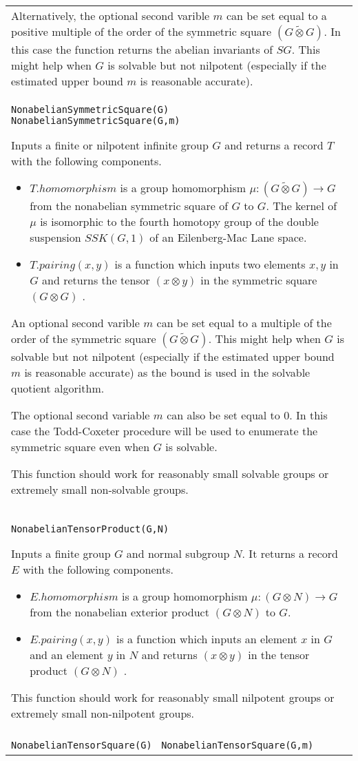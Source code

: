 \documentclass[a4paper,11pt]{report}
\begin{document}
{\begin{center}
\begin{tabular}{|l|}
 Alternatively, the optional second varible $m$ can be set equal to a positive multiple of the order of the symmetric square $(G \tilde\otimes G)$. In this case the function returns the abelian invariants of $SG$. This might help when $G$ is solvable but not nilpotent (especially if the estimated upper bound $m$ is reasonable accurate). \\
 \index{NonabelianSymmetricSquare} \texttt{NonabelianSymmetricSquare(G) } \texttt{NonabelianSymmetricSquare(G,m) } 

 Inputs a finite or nilpotent infinite group $G$ and returns a record $T$ with the following components. 
\begin{itemize}
\item  $T.homomorphism$ is a group homomorphism ${\ensuremath{\mu}} : (G \tilde\otimes G) \longrightarrow G$ from the nonabelian symmetric square of $G$ to $G$. The kernel of ${\ensuremath{\mu}}$ is isomorphic to the fourth homotopy group of the double suspension $SSK(G,1)$ of an Eilenberg-Mac Lane space. 
\item  $T.pairing(x,y)$ is a function which inputs two elements $x, y$ in $G$ and returns the tensor $(x \otimes y)$ in the symmetric square $(G \otimes G)$ . 
\end{itemize}
 An optional second varible $m$ can be set equal to a multiple of the order of the symmetric square $(G \tilde\otimes G)$. This might help when $G$ is solvable but not nilpotent (especially if the estimated upper bound $m$ is reasonable accurate) as the bound is used in the solvable quotient
algorithm. 

 The optional second variable $m$ can also be set equal to $0$. In this case the Todd-Coxeter procedure will be used to enumerate the
symmetric square even when $G$ is solvable. 

 This function should work for reasonably small solvable groups or extremely
small non-solvable groups. \\
 \index{NonabelianTensorProduct} \texttt{NonabelianTensorProduct(G,N) } 

 Inputs a finite group $G$ and normal subgroup $N$. It returns a record $E$ with the following components. 
\begin{itemize}
\item  $E.homomorphism$ is a group homomorphism ${\ensuremath{\mu}} : (G \otimes N ) \longrightarrow G$ from the nonabelian exterior product $(G \otimes N)$ to $G$. 
\item  $E.pairing(x,y)$ is a function which inputs an element $x$ in $G$ and an element $y$ in $N$ and returns $(x \otimes y)$ in the tensor product $(G \otimes N)$ . 
\end{itemize}
 This function should work for reasonably small nilpotent groups or extremely
small non-nilpotent groups. \\
 \index{NonabelianTensorSquare} \texttt{NonabelianTensorSquare(G) } \texttt{NonabelianTensorSquare(G,m) } 


\end{tabular}
\end{center}}
\end{document}
